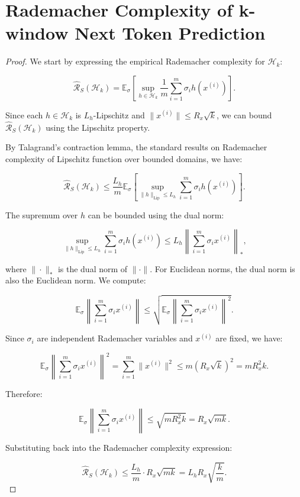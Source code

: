 

\section{Rademacher Complexity of k-window Next Token Prediction}\label{appendix: rade}
\begin{proof}
We start by expressing the empirical Rademacher complexity for \( \mathcal{H}_k \):

\[
\hat{\mathcal{R}}_S(\mathcal{H}_k) = \mathbb{E}_{\sigma} \left[ \sup_{h \in \mathcal{H}_k} \frac{1}{m} \sum_{i=1}^m \sigma_i h(x^{(i)}) \right].
\]

Since each \( h \in \mathcal{H}_k \) is \( L_h \)-Lipschitz and \( \| x^{(i)} \| \leq R_x \sqrt{k} \), we can bound \( \hat{\mathcal{R}}_S(\mathcal{H}_k) \) using the Lipschitz property.


By Talagrand's contraction lemma\citep{ledoux2013probability}, the standard results on Rademacher complexity of Lipschitz function over bounded domains, we have:

\[
\hat{\mathcal{R}}_S(\mathcal{H}_k) \leq \frac{L_h}{m} \mathbb{E}_{\sigma} \left[ \sup_{\| h \|_{\text{Lip}} \leq L_h} \sum_{i=1}^m \sigma_i h(x^{(i)}) \right].
\]


The supremum over \( h \) can be bounded using the dual norm:

\[
\sup_{\| h \|_{\text{Lip}} \leq L_h} \sum_{i=1}^m \sigma_i h(x^{(i)}) \leq L_h \left\| \sum_{i=1}^m \sigma_i x^{(i)} \right\|_*,
\]

where \( \| \cdot \|_* \) is the dual norm of \( \| \cdot \| \). For Euclidean norms, the dual norm is also the Euclidean norm. We compute:

\[
\mathbb{E}_{\sigma} \left\| \sum_{i=1}^m \sigma_i x^{(i)} \right\| \leq \sqrt{ \mathbb{E}_{\sigma} \left\| \sum_{i=1}^m \sigma_i x^{(i)} \right\|^2 }.
\]

Since \( \sigma_i \) are independent Rademacher variables and \( x^{(i)} \) are fixed, we have:

\[
\mathbb{E}_{\sigma} \left\| \sum_{i=1}^m \sigma_i x^{(i)} \right\|^2 = \sum_{i=1}^m \| x^{(i)} \|^2 \leq m (R_x \sqrt{k})^2 = m R_x^2 k.
\]

Therefore:

\[
\mathbb{E}_{\sigma} \left\| \sum_{i=1}^m \sigma_i x^{(i)} \right\| \leq \sqrt{m R_x^2 k} = R_x \sqrt{m k}.
\]


Substituting back into the Rademacher complexity expression:

\[
\hat{\mathcal{R}}_S(\mathcal{H}_k) \leq \frac{L_h}{m} \cdot R_x \sqrt{m k} = L_h R_x \sqrt{\frac{k}{m}}.
\]


\end{proof}
